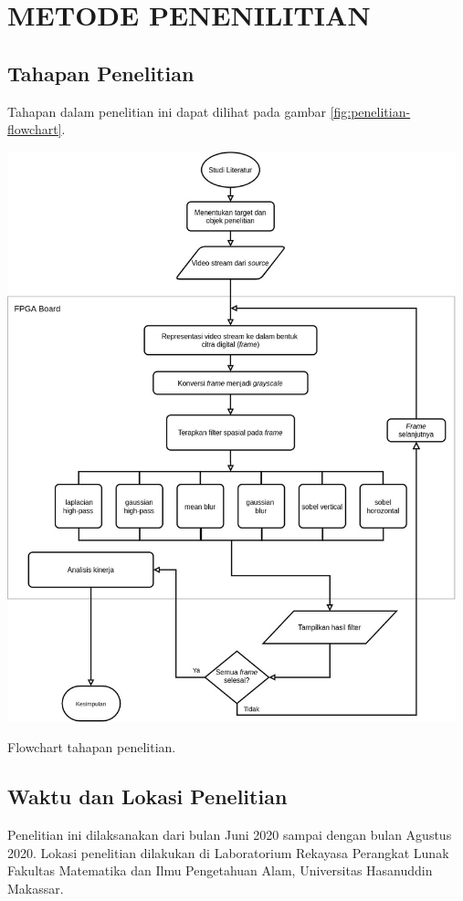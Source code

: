 
\chapter{METODE PENENILITIAN}


\section{Tahapan Penelitian}
Tahapan dalam penelitian ini dapat dilihat pada gambar \ref{fig:penelitian-flowchart}.
\begin{afigure}
    \includegraphics[width=13cm, center]{images/penelitian-flowchart.jpg}
    \caption{Flowchart tahapan penelitian.}
    \label{fig:penelitian-flowchart}
\end{afigure}


\section{Waktu dan Lokasi Penelitian}
Penelitian ini dilaksanakan dari bulan Juni 2020 sampai dengan bulan Agustus 2020. Lokasi penelitian dilakukan di Laboratorium Rekayasa Perangkat Lunak Fakultas Matematika dan Ilmu Pengetahuan Alam, Universitas Hasanuddin Makassar.

